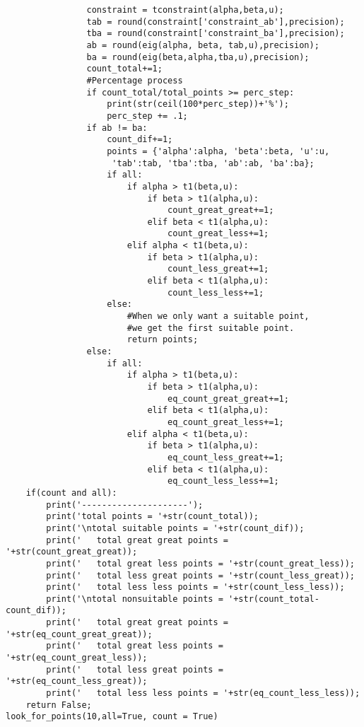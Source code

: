 {\begin{verbatim}
                constraint = tconstraint(alpha,beta,u);
                tab = round(constraint['constraint_ab'],precision);
                tba = round(constraint['constraint_ba'],precision);
                ab = round(eig(alpha, beta, tab,u),precision);
                ba = round(eig(beta,alpha,tba,u),precision);
                count_total+=1;
                #Percentage process
                if count_total/total_points >= perc_step:
                    print(str(ceil(100*perc_step))+'%');
                    perc_step += .1;
                if ab != ba:
                    count_dif+=1;
                    points = {'alpha':alpha, 'beta':beta, 'u':u,
                     'tab':tab, 'tba':tba, 'ab':ab, 'ba':ba};
                    if all:
                        if alpha > t1(beta,u):
                            if beta > t1(alpha,u):
                                count_great_great+=1;
                            elif beta < t1(alpha,u):
                                count_great_less+=1;
                        elif alpha < t1(beta,u):
                            if beta > t1(alpha,u):
                                count_less_great+=1;
                            elif beta < t1(alpha,u):
                                count_less_less+=1;
                    else:
                        #When we only want a suitable point, 
                        #we get the first suitable point. 
                        return points; 
                else:
                    if all:
                        if alpha > t1(beta,u):
                            if beta > t1(alpha,u):
                                eq_count_great_great+=1;
                            elif beta < t1(alpha,u):
                                eq_count_great_less+=1;
                        elif alpha < t1(beta,u):
                            if beta > t1(alpha,u):
                                eq_count_less_great+=1;
                            elif beta < t1(alpha,u):
                                eq_count_less_less+=1;
    if(count and all):
        print('---------------------');
        print('total points = '+str(count_total));
        print('\ntotal suitable points = '+str(count_dif));
        print('   total great great points = '+str(count_great_great));
        print('   total great less points = '+str(count_great_less));
        print('   total less great points = '+str(count_less_great));
        print('   total less less points = '+str(count_less_less));
        print('\ntotal nonsuitable points = '+str(count_total-count_dif));
        print('   total great great points = '+str(eq_count_great_great));
        print('   total great less points = '+str(eq_count_great_less));
        print('   total less great points = '+str(eq_count_less_great));
        print('   total less less points = '+str(eq_count_less_less));
    return False;
look_for_points(10,all=True, count = True)
\end{verbatim}
}